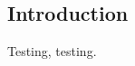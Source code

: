 \documentclass[../thesis/thesis.tex]{subfiles}
\begin{document}
\begin{refsection}
\chapter{Introduction}
Testing, testing\cite{Stant_2016_Coll, Stant_2016}.
\printbibliography
\end{refsection}
\end{document}
